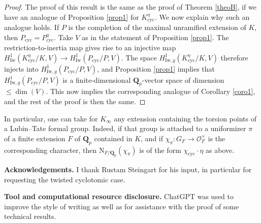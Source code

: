 \documentclass[12pt,english,a4paper]{smfart}
\newcommand{\Qp}{\mathbf{Q}_p}
\newcommand{\Iw}{\mathrm{Iw}}
\newcommand{\Nm}{\mathrm{N}}
\newcommand{\cyc}{\mathrm{cyc}}
\begin{document}
\begin{proof}
The proof of this result is the same as the proof of Theorem \ref{theoB}, if we have an analogue of Proposition \ref{prop1} for $K_{\cyc}^{\eta}$. We now explain why such an analogue holds. If $P$ is the completion of the maximal unramified extension of $K$, then $P_{\cyc} = P^\eta_{\cyc}$. Take $V$ as in the statement of Proposition \ref{prop1}. The restriction-to-inertia map gives rise to an injective map $H^1_{\Iw}(K_{\cyc}^\eta/K,V) \to H^1_{\Iw}(P_{\cyc}/P,V)$. The space $H^1_{\Iw,g}(K_{\cyc}^\eta/K,V)$ therefore injects into $H^1_{\Iw,g}(P_{\cyc}/P,V)$, and Proposition \ref{prop1} implies that $H^1_{\Iw,g}(P_{\cyc}/P,V)$ is a finite-dimensional $\Qp$-vector space of dimension $\leq \dim(V)$. This now implies the corresponding analogue of Corollary \ref{coro1}, and the rest of the proof is then the same.
\end{proof}

In particular, one can take for $K_\infty$ any extension containing the torsion points of a Lubin--Tate formal group. Indeed, if that group is attached to a uniformizer $\pi$ of a finite extension $F$ of $\Qp$ contained in $K$, and if $\chi_{\pi} : G_F \to \mathcal{O}_F^\times$ is the corresponding character, then $\Nm_{F/\Qp} (\chi_{\pi})$ is of the form $\chi_{\cyc} \cdot \eta$ as above.

\vspace{\baselineskip}

\noindent\textbf{Acknowledgements.} I thank Rustam Steingart for his input, in particular for requesting the twisted cyclotomic case.

\vspace{\baselineskip}

\noindent\textbf{Tool and computational resource disclosure.} ChatGPT was used to improve the style of writing as well as for assistance with the proof of some technical results.



\end{document}
